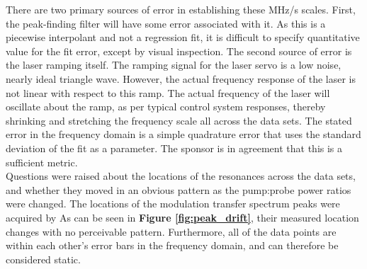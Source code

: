 There are two primary sources of error in establishing these MHz/s scales. First, the peak-finding filter will have some error associated with it. As this is a piecewise interpolant and not a regression fit, it is difficult to specify quantitative value for the fit error, except by visual inspection. The second source of error is the laser ramping itself. The ramping signal for the laser servo is a low noise, nearly ideal triangle wave. However, the actual frequency response of the laser is not linear with respect to this ramp. The actual frequency of the laser will oscillate about the ramp, as per typical control system responses, thereby shrinking and stretching the frequency scale all across the data sets. The stated error in the frequency domain is a simple quadrature error that uses the standard deviation of the fit as a parameter. The sponsor is in agreement that this is a sufficient metric. \\

Questions were raised about the locations of the resonances across the data sets, and whether they moved in an obvious pattern as the pump:probe power ratios were changed. The locations of the modulation transfer spectrum peaks were acquired by As can be seen in \textbf{Figure \ref{fig:peak_drift}}, their measured location changes with no perceivable pattern. Furthermore, all of the data points are within each other's error bars in the frequency domain, and can therefore be considered static. \\

